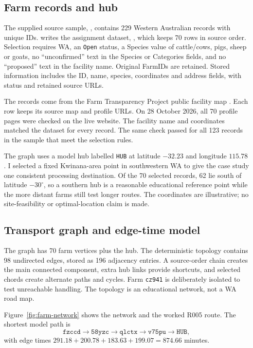 \documentclass[10pt,a4paper]{article}
\begin{document}
\subsection{Farm records and hub}

The supplied source sample, , contains 229 Western Australian records with unique IDs.  writes the assignment dataset, , which keeps 70 rows in source order. Selection requires WA, an \texttt{Open} status, a Species value of cattle/cows, pigs, sheep or goats, no ``unconfirmed'' text in the Species or Categories fields, and no ``proposed'' text in the facility name. Original FarmIDs are retained. Stored information includes the ID, name, species, coordinates and address fields, with status and retained source URLs.

The records come from the Farm Transparency Project public facility map \cite{farmtransparency}. Each row keeps its source map and profile URLs. On 28 October 2026, all 70 profile pages were checked on the live website. The facility name and coordinates matched the dataset for every record. The same check passed for all 123 records in the sample that meet the selection rules.

The graph uses a model hub labelled \texttt{HUB} at latitude $-32.23$ and longitude $115.78$. I selected a fixed Kwinana-area point in southwestern WA to give the case study one consistent processing destination. Of the 70 selected records, 62 lie south of latitude $-30^\circ$, so a southern hub is a reasonable educational reference point while the more distant farms still test longer routes. The coordinates are illustrative; no site-feasibility or optimal-location claim is made.

\subsection{Transport graph and edge-time model}

The graph has 70 farm vertices plus the hub. The deterministic topology contains 98 undirected edges, stored as 196 adjacency entries. A source-order chain creates the main connected component, extra hub links provide shortcuts, and selected chords create alternate paths and cycles. Farm \texttt{cz941} is deliberately isolated to test unreachable handling. The topology is an educational network, not a WA road map.

Figure~\ref{fig:farm-network} shows the network and the worked R005 route. The shortest model path is
\[
\texttt{fzccd}\rightarrow\texttt{58yzc}\rightarrow\texttt{qlctx}\rightarrow\texttt{v75pu}\rightarrow\texttt{HUB},
\]
with edge times $291.18+200.78+183.63+199.07=874.66$ minutes.
\end{document}
